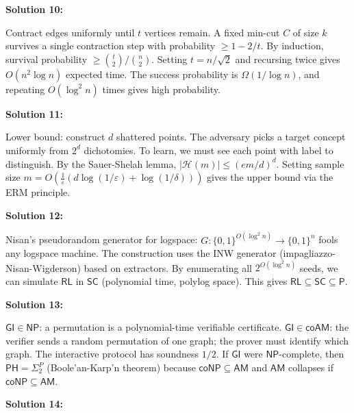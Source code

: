 \documentclass[12pt,a4paper]{exam}
\begin{document}
\vspace{0.5cm}

\textbf{Solution 10:}

Contract edges uniformly until $t$ vertices remain. A fixed min-cut $C$ of size $k$ survives a single contraction step with probability $\geq 1 - 2/t$. By induction, survival probability $\geq \binom{t}{2}/\binom{n}{2}$. Setting $t = n/\sqrt{2}$ and recursing twice gives $O(n^2 \log n)$ expected time. The success probability is $\Omega(1/\log n)$, and repeating $O(\log^2 n)$ times gives high probability.

\vspace{0.5cm}

\textbf{Solution 11:}

Lower bound: construct $d$ shattered points. The adversary picks a target concept uniformly from $2^d$ dichotomies. To learn, we must see each point with label to distinguish. By the Sauer-Shelah lemma, $|\mathcal{H}(m)| \leq (em/d)^d$. Setting sample size $m = O(\frac{1}{\varepsilon}(d \log(1/\varepsilon) + \log(1/\delta)))$ gives the upper bound via the ERM principle.

\vspace{0.5cm}

\textbf{Solution 12:}

Nisan's pseudorandom generator for logspace: $G: \{0,1\}^{O(\log^2 n)} \to \{0,1\}^{n}$ fools any logspace machine. The construction uses the INW generator (impagliazzo-Nisan-Wigderson) based on extractors. By enumerating all $2^{O(\log^2 n)}$ seeds, we can simulate $\mathsf{RL}$ in $\mathsf{SC}$ (polynomial time, polylog space). This gives $\mathsf{RL} \subseteq \mathsf{SC} \subseteq \mathsf{P}$.

\vspace{0.5cm}

\textbf{Solution 13:}

$\mathsf{GI} \in \mathsf{NP}$: a permutation is a polynomial-time verifiable certificate. $\mathsf{GI} \in \mathsf{coAM}$: the verifier sends a random permutation of one graph; the prover must identify which graph. The interactive protocol has soundness $1/2$. If $\mathsf{GI}$ were $\mathsf{NP}$-complete, then $\mathsf{PH} = \Sigma_2^P$ (Boole'an-Karp'n theorem) because $\mathsf{coNP} \subseteq \mathsf{AM}$ and $\mathsf{AM}$ collapses if $\mathsf{coNP} \subseteq \mathsf{AM}$.

\vspace{0.5cm}

\textbf{Solution 14:}
\end{document}
